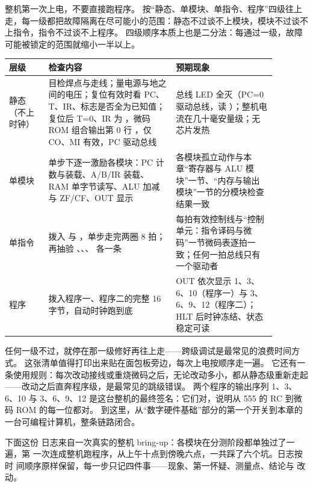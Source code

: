 整机第一次上电，不要直接跑程序。
按“静态、单模块、单指令、程序”四级往上走，每一级都把故障隔离在尽可能小的范围：静态不过谈不上模块，模块不过谈不上指令，指令不过谈不上程序。
四级顺序本质上也是二分法：每通过一级，故障可能被锁定的范围就缩小一半以上。

\begin{longtable}{L{0.13\linewidth}L{0.42\linewidth}L{0.33\linewidth}}
\toprule
层级 & 检查内容 & 预期现象 \\
\midrule
静态（不上时钟） & 目检焊点与走线；量电源与地之间的电压；复位有效时看 PC、T、IR、标志是否全为已知值；复位后 T=0、IR 为 ，微码 ROM 组合输出第 0 行 ，仅 CO、MI 有效，PC 驱动总线 & 总线 LED 全灭（PC=0 驱动总线，读 ）；整机电流在几十毫安量级；无芯片发热 \\\tablerowrule
单模块 & 单步下逐一激励各模块：PC 计数与装载、A/B/IR 装载、RAM 单字节读写、ALU 加减与 ZF/CF、OUT 显示 & 各模块孤立动作与本章“寄存器与 ALU 模块”一节、“内存与输出模块”一节的分模块检查结果一致 \\\tablerowrule
单指令 & 拨入  与 ，单步走完两圈 8 拍；再抽验 、、、 各一条 & 每拍有效控制线与“控制单元：指令译码与微码”一节微码表逐拍一致；任何一拍总线只有一个驱动者 \\\tablerowrule
程序 & 拨入程序一、程序二的完整 16 字节，自动时钟跑到底 & OUT 依次显示 1、3、6、10（程序一）与 3、6、9、12（程序二）；HLT 后时钟冻结、状态稳定可读 \\
\bottomrule
\end{longtable}

任何一级不过，就停在那一级修好再往上走——跨级调试是最常见的浪费时间方式。
这张清单值得打印出来贴在面包板旁边，每次上电按顺序走一遍。
它还有一条使用规则：每次改动接线或重烧微码之后，无论改动多小，都从静态级重新走起——改动之后直奔程序级，是最常见的跳级错误。
两个程序的输出序列 1、3、6、10 与 3、6、9、12 是这台整机的最终签名：它们对，说明从 555 的 RC 到微码 ROM 的每一位都对。
到这里，从“数字硬件基础”部分的第一个开关到本章的一台可编程计算机，整条链路闭合。

下面这份
日志来自一次真实的整机 bring-up：各模块在分测阶段都单独过了一遍，第
一次连成整机跑程序，从上午十点到傍晚六点，一共踩了六个坑。日志按时
间顺序原样保留，每一步只记四件事——现象、第一怀疑、测量点、结论与
改动。

